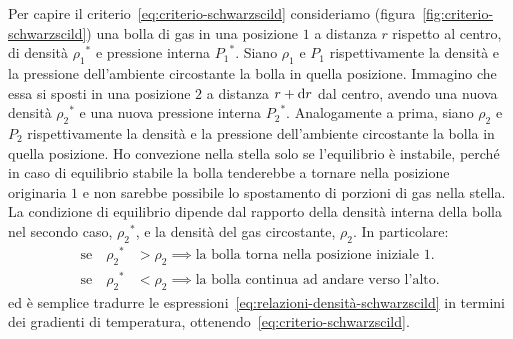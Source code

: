 Per capire il criterio~\eqref{eq:criterio-schwarzscild} consideriamo (figura~\ref{fig:criterio-schwarzscild}) una bolla di gas in una posizione $1$ a distanza $r$ rispetto al centro, di densità ${\rho_1}^*$ e pressione interna ${P_1}^*$. Siano $\rho_1$ e $P_1$ rispettivamente la densità e la pressione dell'ambiente circostante la bolla in quella posizione. Immagino che essa si sposti in una posizione $2$ a distanza $r + \mathop{\mathrm{{}d}}\mathopen{} r$ dal centro, avendo una nuova densità ${\rho_2}^*$ e una nuova pressione interna ${P_2}^*$. Analogamente a prima, siano $\rho_2$ e $P_2$ rispettivamente la densità e la pressione dell'ambiente circostante la bolla in quella posizione. Ho convezione nella stella solo se l'equilibrio è instabile, perché in caso di equilibrio stabile la bolla tenderebbe a tornare nella posizione originaria $1$ e non sarebbe possibile lo spostamento di porzioni di gas nella stella. La condizione di equilibrio dipende dal rapporto della densità interna della bolla nel secondo caso, ${\rho_2}^*$, e la densità del gas circostante, $\rho_2$. In particolare:
\begin{subequations}
\label{eq:relazioni-densità-schwarzscild}
\begin{align}
  \text{se} \quad {\rho_2}^* &> \rho_2 \implies \text{la bolla torna nella posizione iniziale $1$.} \\
  \text{se} \quad {\rho_2}^* &< \rho_2 \implies \text{la bolla continua ad andare verso l'alto.} 
\end{align}
\end{subequations}
ed è semplice tradurre le espressioni~\eqref{eq:relazioni-densità-schwarzscild} in termini dei gradienti di temperatura, ottenendo~\eqref{eq:criterio-schwarzscild}.

